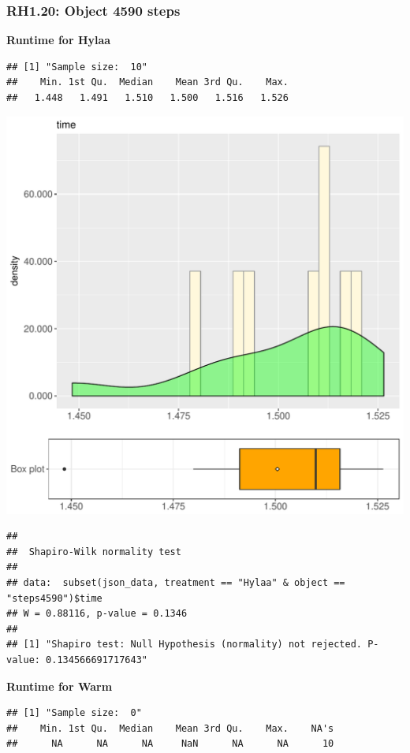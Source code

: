 \documentclass{article}\usepackage[]{graphicx}\usepackage[]{color}
\makeatletter
\def\maxwidth{ %
  \ifdim\Gin@nat@width>\linewidth
    \linewidth
  \else
    \Gin@nat@width
  \fi
}
\newenvironment{kframe}{%
 \def\at@end@of@kframe{}%
 \ifinner\ifhmode%
  \def\at@end@of@kframe{\end{minipage}}%
  \begin{minipage}{\columnwidth}%
 \fi\fi%
 \def\FrameCommand##1{\hskip\@totalleftmargin \hskip-\fboxsep
 \colorbox{shadecolor}{##1}\hskip-\fboxsep
     \hskip-\linewidth \hskip-\@totalleftmargin \hskip\columnwidth}%
 \MakeFramed {\advance\hsize-\width
   \@totalleftmargin\z@ \linewidth\hsize
   \@setminipage}}%
 {\par\unskip\endMakeFramed%
 \at@end@of@kframe}
\newenvironment{knitrout}{}{} %
\makeatother
\begin{document}
\subsubsection{RH1.20: Object 4590 steps}

 \textbf{Runtime for Hylaa}
\begin{knitrout}
\color{fgcolor}\begin{kframe}
\begin{verbatim}
## [1] "Sample size:  10"
##    Min. 1st Qu.  Median    Mean 3rd Qu.    Max. 
##   1.448   1.491   1.510   1.500   1.516   1.526
\end{verbatim}
\end{kframe}
\includegraphics[width=\maxwidth]{figure/RH1_Hylaa_steps4590-1} 
\begin{kframe}\begin{verbatim}
## 
## 	Shapiro-Wilk normality test
## 
## data:  subset(json_data, treatment == "Hylaa" & object == "steps4590")$time
## W = 0.88116, p-value = 0.1346
## 
## [1] "Shapiro test: Null Hypothesis (normality) not rejected. P-value: 0.134566691717643"
\end{verbatim}
\end{kframe}
\end{knitrout}
 \textbf{Runtime for Warm}
\begin{knitrout}
\color{fgcolor}\begin{kframe}
\begin{verbatim}
## [1] "Sample size:  0"
##    Min. 1st Qu.  Median    Mean 3rd Qu.    Max.    NA's 
##      NA      NA      NA     NaN      NA      NA      10
\end{verbatim}
\end{kframe}
\end{knitrout}
  
\end{document}
